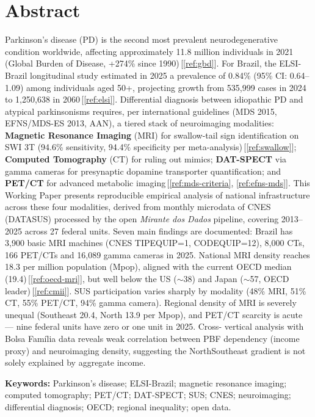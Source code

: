 \documentclass[12pt,a4paper,oneside]{article}
\begin{document}
\section*{Abstract}
\begin{singlespace}\small\noindent
Parkinson's disease (PD) is the second most prevalent
neurodegenerative condition worldwide, affecting approximately 11.8
million individuals in 2021 (Global Burden of Disease, +274\% since
1990)\,[\ref{ref:gbd}]. For Brazil, the ELSI-Brazil longitudinal
study estimated in 2025 a prevalence of 0.84\% (95\% CI: 0.64–1.09)
among individuals aged 50+, projecting growth from 535,999 cases in
2024 to 1,250,638 in 2060\,[\ref{ref:elsi}]. Differential diagnosis
between idiopathic PD and atypical parkinsonisms requires, per
international guidelines (MDS 2015, EFNS/MDS-ES 2013, AAN), a tiered
stack of neuroimaging modalities: \textbf{Magnetic Resonance Imaging}
(MRI) for swallow-tail sign identification on SWI 3T (94.6\%
sensitivity, 94.4\% specificity per meta-analysis)\,[\ref{ref:swallow}];
\textbf{Computed Tomography} (CT) for ruling out mimics;
\textbf{DAT-SPECT} via gamma cameras for presynaptic dopamine
transporter quantification; and \textbf{PET/CT} for advanced
metabolic imaging\,[\ref{ref:mds-criteria}, \ref{ref:efns-mds}].
This Working Paper presents reproducible empirical analysis of
national infrastructure across these four modalities, derived from
monthly microdata of CNES (DATASUS) processed by the open
\textit{Mirante dos Dados} pipeline, covering 2013–2025 across 27
federal units. Seven main findings are documented: Brazil has 3,900
basic MRI machines (CNES TIPEQUIP=1, CODEQUIP=12), 8,000 CTs, 166
PET/CTs and 16,089 gamma cameras in 2025. National MRI density
reaches 18.3 per million population (Mpop), aligned with the current
OECD median (19.4)\,[\ref{ref:oecd-mri}], but well below the US
($\sim$38) and Japan ($\sim$57, OECD leader)\,[\ref{ref:cmii}]. SUS
participation varies sharply by modality (48\% MRI, 51\% CT, 55\%
PET/CT, 94\% gamma camera). Regional density of MRI is severely
unequal (Southeast 20.4, North 13.9 per Mpop), and PET/CT scarcity
is acute — nine federal units have zero or one unit in 2025. Cross-
vertical analysis with Bolsa Família data reveals weak correlation
between PBF dependency (income proxy) and neuroimaging density,
suggesting the North\textendash Southeast gradient is not solely
explained by aggregate income.

\vspace{0.4cm}\noindent\textbf{Keywords:}
Parkinson's disease; ELSI-Brazil; magnetic resonance imaging;
computed tomography; PET/CT; DAT-SPECT; SUS; CNES; neuroimaging;
differential diagnosis; OECD; regional inequality; open data.
\end{singlespace}
\end{document}
